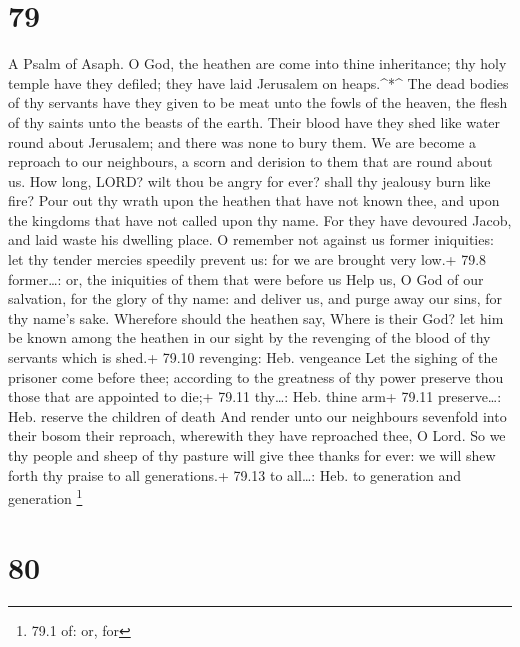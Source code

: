 \hypertarget{section-78}{%
\section{79}\label{section-78}}

A Psalm of Asaph.  O God, the heathen are come into thine
inheritance; thy holy temple have they defiled; they have laid Jerusalem
on heaps.\^{}*\^{}  The dead bodies of thy servants have
they given to be meat unto the fowls of the heaven, the flesh of thy
saints unto the beasts of the earth.  Their blood have they
shed like water round about Jerusalem; and there was none to bury them.
 We are become a reproach to our neighbours, a scorn and
derision to them that are round about us.  How long, LORD?
wilt thou be angry for ever? shall thy jealousy burn like fire?
 Pour out thy wrath upon the heathen that have not known
thee, and upon the kingdoms that have not called upon thy name.
 For they have devoured Jacob, and laid waste his dwelling
place.  O remember not against us former iniquities: let thy
tender mercies speedily prevent us: for we are brought very low.+ 79.8
former\ldots: or, the iniquities of them that were before us
 Help us, O God of our salvation, for the glory of thy name:
and deliver us, and purge away our sins, for thy name's sake.
 Wherefore should the heathen say, Where is their God? let
him be known among the heathen in our sight by the revenging of the
blood of thy servants which is shed.+ 79.10 revenging: Heb. vengeance
 Let the sighing of the prisoner come before thee;
according to the greatness of thy power preserve thou those that are
appointed to die;+ 79.11 thy\ldots: Heb. thine arm+ 79.11
preserve\ldots: Heb. reserve the children of death  And
render unto our neighbours sevenfold into their bosom their reproach,
wherewith they have reproached thee, O Lord.  So we thy
people and sheep of thy pasture will give thee thanks for ever: we will
shew forth thy praise to all generations.+ 79.13 to all\ldots: Heb. to
generation and generation \footnote{79.1 of: or, for}

\hypertarget{section-79}{%
\section{80}\label{section-79}}

